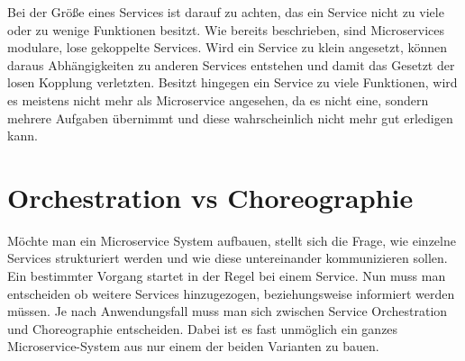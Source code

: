 Bei der Größe eines Services ist darauf zu achten, das ein Service nicht zu viele oder zu wenige Funktionen besitzt. Wie bereits beschrieben, sind Microservices modulare, lose gekoppelte Services. Wird ein Service zu klein angesetzt, können daraus Abhängigkeiten zu anderen Services entstehen und damit das Gesetzt der losen Kopplung verletzten. Besitzt hingegen ein Service zu viele Funktionen, wird es meistens nicht mehr als Microservice angesehen, da es nicht eine, sondern mehrere Aufgaben übernimmt und diese wahrscheinlich nicht mehr gut erledigen kann.

\section{Orchestration vs Choreographie}
\label{sec:orchestrationvschoreographie}
Möchte man ein Microservice System aufbauen, stellt sich die Frage, wie einzelne Services strukturiert werden und wie diese untereinander kommunizieren sollen. Ein bestimmter Vorgang startet in der Regel bei einem Service. Nun muss man entscheiden ob weitere Services hinzugezogen, beziehungsweise informiert werden müssen.
Je nach Anwendungsfall muss man sich zwischen Service Orchestration und Choreographie entscheiden. Dabei ist es fast unmöglich ein ganzes Microservice-System aus nur einem der beiden Varianten zu bauen.

